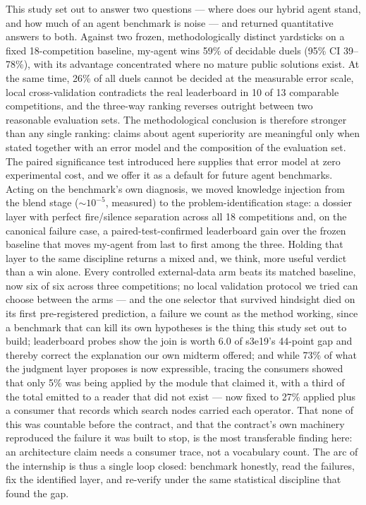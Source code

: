 \documentclass[11pt,a4paper]{article}
\begin{document}
This study set out to answer two questions --- where does our hybrid agent stand, and how much of an agent benchmark is noise --- and returned quantitative answers to both. Against two frozen, methodologically distinct yardsticks on a fixed 18-competition baseline, my-agent wins 59\% of decidable duels (95\% CI 39--78\%), with its advantage concentrated where no mature public solutions exist. At the same time, 26\% of all duels cannot be decided at the measurable error scale, local cross-validation contradicts the real leaderboard in 10 of 13 comparable competitions, and the three-way ranking reverses outright between two reasonable evaluation sets. The methodological conclusion is therefore stronger than any single ranking: claims about agent superiority are meaningful only when stated together with an error model and the composition of the evaluation set. The paired significance test introduced here supplies that error model at zero experimental cost, and we offer it as a default for future agent benchmarks. Acting on the benchmark's own diagnosis, we moved knowledge injection from the blend stage (${\sim}10^{-5}$, measured) to the problem-identification stage: a dossier layer with perfect fire/silence separation across all 18 competitions and, on the canonical failure case, a paired-test-confirmed leaderboard gain over the frozen baseline that moves my-agent from last to first among the three. Holding that layer to the same discipline returns a mixed and, we think, more useful verdict than a win alone. Every controlled external-data arm beats its matched baseline, now six of six across three competitions; no local validation protocol we tried can choose between the arms --- and the one selector that survived hindsight died on its first pre-registered prediction, a failure we count as the method working, since a benchmark that can kill its own hypotheses is the thing this study set out to build; leaderboard probes show the join is worth $6.0$ of s3e19's 44-point gap and thereby correct the explanation our own midterm offered; and while 73\% of what the judgment layer proposes is now expressible, tracing the consumers showed that only 5\% was being applied by the module that claimed it, with a third of the total emitted to a reader that did not exist --- now fixed to 27\% applied plus a consumer that records which search nodes carried each operator. That none of this was countable before the contract, and that the contract's own machinery reproduced the failure it was built to stop, is the most transferable finding here: an architecture claim needs a consumer trace, not a vocabulary count. The arc of the internship is thus a single loop closed: benchmark honestly, read the failures, fix the identified layer, and re-verify under the same statistical discipline that found the gap.
\end{document}
